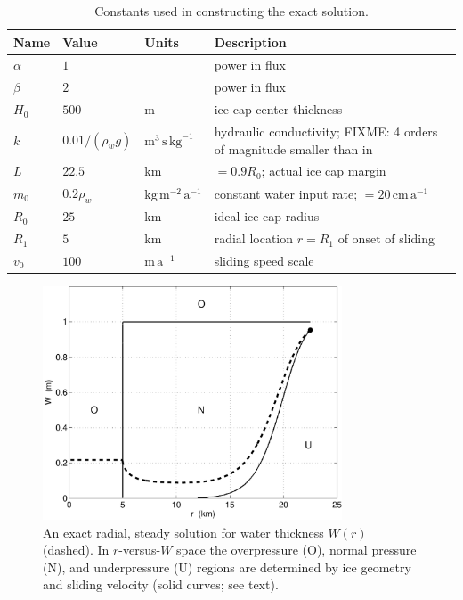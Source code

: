 \documentclass[11pt,final]{amsart}
\begin{document}
\begin{table}[ht]
  \centering
  \caption{Constants used in constructing the exact solution.}
  \begin{tabular}{lllp{3.0in}}
    \textbf{Name} & \textbf{Value} & \textbf{Units} & \textbf{Description}\\
\hline
    $\alpha$ & $1$ & & power in flux \\
    $\beta$  & $2$ & & power in flux \\
    $H_0$ & $500$ & m & ice cap center thickness \\
    $k$   & $0.01/(\rho_w g)$ & $\text{m}^3\,\text{s}\,\text{kg}^{-1}$ & hydraulic conductivity; FIXME: 4 orders of magnitude smaller than in \cite{Hewittetal2012} \\
    $L$   & $22.5$& km & $=0.9 R_0$; actual ice cap margin \\
    $m_0$ & $0.2\rho_w$ & $\text{kg}\,\text{m}^{-2}\,\text{a}^{-1}$ & constant water input rate; $= 20 \,\text{cm}\,\text{a}^{-1}$ \\
    $R_0$ & $25$  & km & ideal ice cap radius \\
    $R_1$ & $5$   & km & radial location $r=R_1$ of onset of sliding \\
    $v_0$ & $100$ & $\text{m}\,\text{a}^{-1}$ & sliding speed scale \\
    \hline
  \end{tabular}
 \label{tab:verifconstants}
\end{table}

\begin{figure}[ht]
\includegraphics[width=3.5in,keepaspectratio=true]{exact-W-plot-onu}
\caption{An exact radial, steady solution for water thickness $W(r)$ (dashed).  In $r$-versus-$W$ space the overpressure (O), normal pressure (N), and underpressure (U) regions are determined by ice geometry and sliding velocity (solid curves; see text).}
\label{fig:Wexact}
\end{figure}
\end{document}
